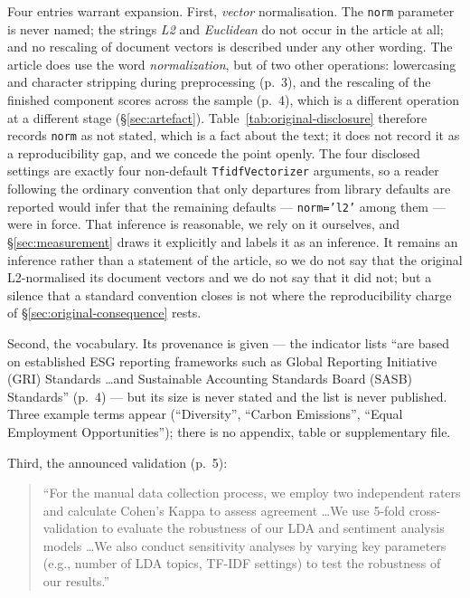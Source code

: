 Four entries warrant expansion. First, \emph{vector} normalisation. The \texttt{norm}
parameter is never named; the strings \emph{L2} and \emph{Euclidean} do not occur in the
article at all; and no rescaling of document vectors is described under any other wording.
The article does use the word \emph{normalization}, but of two other operations: lowercasing
and character stripping during preprocessing (p.~3), and the rescaling of the finished
component scores across the sample (p.~4), which is a different operation at a different
stage (\S\ref{sec:artefact}). Table~\ref{tab:original-disclosure} therefore records
\texttt{norm} as not stated, which is a fact about the text; it does not record it as a
reproducibility gap, and we concede the point openly. The four disclosed settings are
exactly four non-default \texttt{TfidfVectorizer} arguments, so a reader following the
ordinary convention that only departures from library defaults are reported would infer
that the remaining defaults --- \texttt{norm='l2'} among them --- were in force. That
inference is reasonable, we rely on it ourselves, and \S\ref{sec:measurement} draws it
explicitly and labels it as an inference. It remains an inference rather than a statement
of the article, so we do not say that the original L2-normalised its document vectors and
we do not say that it did not; but a silence that a standard convention closes is not where
the reproducibility charge of \S\ref{sec:original-consequence} rests.

Second, the vocabulary. Its provenance is given --- the indicator lists ``are based on
established ESG reporting frameworks such as Global Reporting Initiative (GRI) Standards
\ldots and Sustainable Accounting Standards Board (SASB) Standards'' (p.~4) --- but its
size is never stated and the list is never published. Three example terms appear
(``Diversity'', ``Carbon Emissions'', ``Equal Employment Opportunities''); there is no
appendix, table or supplementary file.

Third, the announced validation (p.~5):

\begin{quote}
``For the manual data collection process, we employ two independent raters and calculate
Cohen's Kappa to assess agreement \ldots We use 5-fold cross-validation to evaluate the
robustness of our LDA and sentiment analysis models \ldots We also conduct sensitivity
analyses by varying key parameters (e.g., number of LDA topics, TF-IDF settings) to test
the robustness of our results.''
\end{quote}

